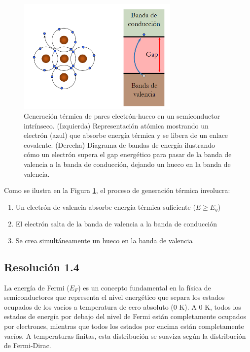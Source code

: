 \documentclass[
  11pt,
  letterpaper,
   addpoints,
  ]{exam}
\begin{document}
\begin{questions}
\begin{solution}
\begin{figure}[H]
    \centering
    \includegraphics[width=0.7\textwidth]{../figures/Auxiliar_2_4}
    \caption{Generación térmica de pares electrón-hueco en un semiconductor intrínseco. (Izquierda) Representación atómica mostrando un electrón (azul) que absorbe energía térmica y se libera de un enlace covalente. (Derecha) Diagrama de bandas de energía ilustrando cómo un electrón supera el gap energético para pasar de la banda de valencia a la banda de conducción, dejando un hueco en la banda de valencia.}
    \label{fig:generacion_termica}
\end{figure}

Como se ilustra en la Figura \ref{fig:generacion_termica}, el proceso de generación térmica involucra:
\begin{enumerate}
    \item Un electrón de valencia absorbe energía térmica suficiente ($E \geq E_g$)
    \item El electrón salta de la banda de valencia a la banda de conducción
    \item Se crea simultáneamente un hueco en la banda de valencia
\end{enumerate}



\subsection*{Resolución 1.4}
La energía de Fermi ($E_F$) es un concepto fundamental en la física de semiconductores que representa el nivel energético que separa los estados ocupados de los vacíos a temperatura de cero absoluto (0 K). A 0 K, todos los estados de energía por debajo del nivel de Fermi están completamente ocupados por electrones, mientras que todos los estados por encima están completamente vacíos. A temperaturas finitas, esta distribución se suaviza según la distribución de Fermi-Dirac.


\end{solution}
\end{questions}
\end{document}
